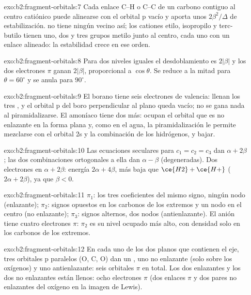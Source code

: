 \begin{solution}{exo:b2:fragment-orbitals:7}
Cada enlace C--H o C--C de un carbono contiguo al centro catiónico puede alinearse con el
orbital p vacío y aporta unos $2\beta^2/\Delta$ de estabilización.  no tiene ningún
vecino así; los cationes etilo, isopropilo y terc-butilo tienen uno, dos y tres grupos metilo
junto al centro, cada uno con un enlace alineado: la estabilidad crece en ese
orden.
\end{solution}

\begin{solution}{exo:b2:fragment-orbitals:8}
Para dos niveles iguales el desdoblamiento es $2|\beta|$ y los dos electrones $\pi$ ganan $2|\beta|$,
proporcional a $\cos\theta$. Se reduce a la mitad para $\theta = 60^\circ$ y se anula para
$90^\circ$.
\end{solution}

\begin{solution}{exo:b2:fragment-orbitals:9}
El borano tiene seis electrones de valencia: llenan los tres , y el orbital p
del boro perpendicular al plano queda vacío; no se gana nada al
piramidalizarse. El amoníaco tiene dos más: ocupan el orbital que es no enlazante en
la forma plana y, como en el agua, la piramidalización le permite mezclarse con el orbital 2s y
la combinación de los hidrógenos, y bajar.
\end{solution}

\begin{solution}{exo:b2:fragment-orbitals:10}
Las ecuaciones seculares para $c_1 = c_2 = c_3$ dan $\alpha + 2\beta$; las dos combinaciones
ortogonales a ella dan $\alpha - \beta$ (degeneradas). Dos electrones en $\alpha + 2\beta$: energía
$2\alpha + 4\beta$, más baja que $\ce{H2} + \ce{H+}$ ($2\alpha + 2\beta$), ya que $\beta < 0$.
\end{solution}

\begin{solution}{exo:b2:fragment-orbitals:11}
$\pi_1$: los tres coeficientes del mismo signo, ningún nodo (enlazante); $\pi_2$: signos opuestos
en los carbonos de los extremos y un nodo en el centro (no enlazante); $\pi_3$: signos
alternos, dos nodos (antienlazante). El anión tiene cuatro electrones $\pi$: $\pi_2$ es su
nivel ocupado más alto, con densidad solo en los carbonos de los extremos.
\end{solution}

\begin{solution}{exo:b2:fragment-orbitals:12}
En cada uno de los dos planos que contienen el eje, tres orbitales p paralelos (O, C, O)
dan un , uno no enlazante (solo sobre los oxígenos) y uno antienlazante: seis
orbitales $\pi$ en total. Los dos enlazantes y los dos no enlazantes están llenos: ocho
electrones $\pi$ (dos enlaces $\pi$ y dos pares no enlazantes del oxígeno en la imagen de Lewis).
\end{solution}

